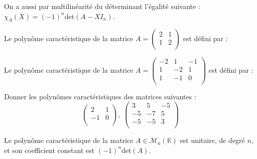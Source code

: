 \documentclass[a4paper,10pt]{report}
\begin{document}
\begin{rem} On a aussi par multilinéarité du déterminant l'égalité suivante : $ \chi_A(X) = (-1)^n \textrm{det}(A-XI_n)$.
\end{rem}

\begin{ex} Le polynôme caractéristique de la matrice $A = \begin{pmatrix}
2 & 1 \\
1 & 2 \\
\end{pmatrix}$ est défini par :
%

\vspace{3cm}
\end{ex}

\begin{ex} Le polynôme caractéristique de la matrice $A = \begin{pmatrix}
-2 & 1& -1  \\
1 & -2 & 1  \\
1 & -1 & 0\\
\end{pmatrix}$ est défini par :

\vspace{6cm}
\end{ex}

\begin{exa} Donner les polynômes caractéristiques des matrices suivantes :
$$ \begin{pmatrix}
2 & 1 \\
-1 & 0 \\
\end{pmatrix}, \; \begin{pmatrix}
3 & 5 & -5 \\
-5 & -7 & 5 \\
-5 & -5 & 3 \\
\end{pmatrix}$$
\end{exa}

\begin{thm} Le polynôme caractéristique de la matrice $A \in \mathcal{M}_n(\mathbb{K})$ est unitaire, de degré $n$, et son coefficient constant est $(-1)^n \textrm{det}(A)$.
\end{thm}
\end{document}
